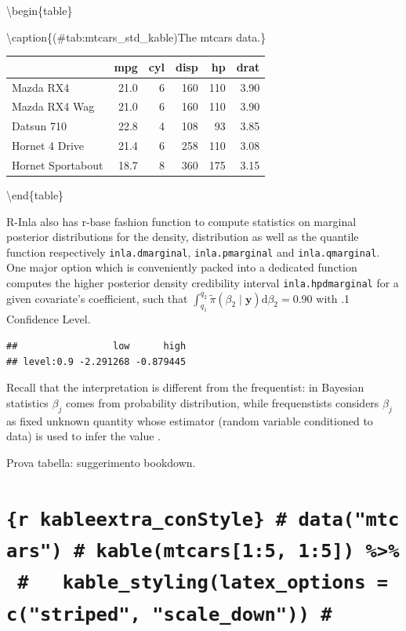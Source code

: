\documentclass[
  12pt,
  a4paper,
  oneside]{book}
\begin{document}
\textbackslash begin\{table\}

\textbackslash caption\{(\#tab:mtcars\_std\_kable)The mtcars data.\}
\centering

\begin{tabular}[t]{lrrrrr}
\toprule
  & mpg & cyl & disp & hp & drat\\
\midrule
Mazda RX4 & 21.0 & 6 & 160 & 110 & 3.90\\
Mazda RX4 Wag & 21.0 & 6 & 160 & 110 & 3.90\\
Datsun 710 & 22.8 & 4 & 108 & 93 & 3.85\\
Hornet 4 Drive & 21.4 & 6 & 258 & 110 & 3.08\\
Hornet Sportabout & 18.7 & 8 & 360 & 175 & 3.15\\
\bottomrule
\end{tabular}

\textbackslash end\{table\}

R-Inla also has r-base fashion function to compute statistics on marginal posterior distributions for the density, distribution as well as the quantile function respectively \texttt{inla.dmarginal}, \texttt{inla.pmarginal} and \texttt{inla.qmarginal}. One major option which is conveniently packed into a dedicated function computes the higher posterior density credibility interval \texttt{inla.hpdmarginal} for a given covariate's coefficient, such that \(\int_{q_{1}}^{q_{2}} \tilde{\pi}\left(\beta_{2} \mid \boldsymbol{y}\right) \mathrm{d} \beta_{2}=0.90\) with .1 Confidence Level.

\begin{verbatim}
##                 low      high
## level:0.9 -2.291268 -0.879445
\end{verbatim}

Recall that the interpretation is different from the frequentist: in Bayesian statistics \(\beta_{j}\) comes from probability distribution, while frequenstists considers \(\beta_{j}\) as fixed unknown quantity whose estimator (random variable conditioned to data) is used to infer the value \citeyearpar{Blangiardo-Cameletti}.

Prova tabella: suggerimento bookdown.

\hypertarget{r-kableextra_constyle-datamtcars-kablemtcars15-15-kable_stylinglatex_options-cstriped-scale_down}{%
\chapter{\texorpdfstring{\texttt{\{r\ kableextra\_conStyle\}\ \#\ data("mtcars")\ \#\ kable(mtcars{[}1:5,\ 1:5{]})\ \%\textgreater{}\%\ \#\ \ \ kable\_styling(latex\_options\ =\ c("striped",\ "scale\_down"))\ \#}}{\{r kableextra\_conStyle\} \# data("mtcars") \# kable(mtcars{[}1:5, 1:5{]}) \%\textgreater\% \#   kable\_styling(latex\_options = c("striped", "scale\_down")) \#}}\label{r-kableextra_constyle-datamtcars-kablemtcars15-15-kable_stylinglatex_options-cstriped-scale_down}}
\end{document}
